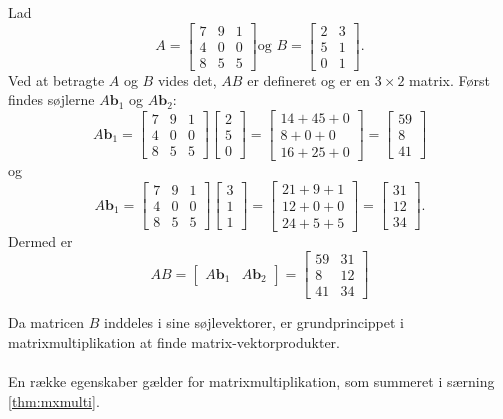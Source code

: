 \begin{eks}
Lad 
$$
A=
\begin{bmatrix}
7 & 9 & 1 \\
4 & 0 & 0 \\
8 & 5 & 5
\end{bmatrix}
\text{og }
B=
\begin{bmatrix}
2 & 3 \\
5 & 1 \\
0 & 1 
\end{bmatrix}
\text{.}
$$
Ved at betragte $A$ og $B$ vides det, $AB$ er defineret og er en $3 \times 2$ matrix. 
Først findes søjlerne $A\textbf{b}_1$ og $A\textbf{b}_2$:
$$
A\textbf{b}_1=
\begin{bmatrix}
7 & 9 & 1 \\
4 & 0 & 0 \\
8 & 5 & 5
\end{bmatrix}
\begin{bmatrix}
2 \\
5 \\
0
\end{bmatrix}
=
\begin{bmatrix}
14 + 45 + 0 \\
8 + 0 + 0 \\
16 + 25 + 0
\end{bmatrix}
=
\begin{bmatrix}
59 \\
8 \\
41
\end{bmatrix}
$$
og
$$
A\textbf{b}_1=
\begin{bmatrix}
7 & 9 & 1 \\
4 & 0 & 0 \\
8 & 5 & 5
\end{bmatrix}
\begin{bmatrix}
3 \\
1 \\
1
\end{bmatrix}
=
\begin{bmatrix}
21 + 9 + 1 \\
12 + 0 + 0 \\
24 + 5 + 5
\end{bmatrix}
=
\begin{bmatrix}
31 \\
12 \\
34
\end{bmatrix}
\text{.}
$$
Dermed er 
$$
AB=
\begin{bmatrix}
A\textbf{b}_1 & A\textbf{b}_2
\end{bmatrix}
=
\begin{bmatrix}
59 & 31 \\
8 & 12 \\
41 & 34
\end{bmatrix}
$$
\end{eks}
Da matricen $B$ inddeles i sine søjlevektorer, er grundprincippet i matrixmultiplikation at finde matrix-vektorprodukter.\\\\
En række egenskaber gælder for matrixmultiplikation, som summeret i særning \ref{thm:mxmulti}.

